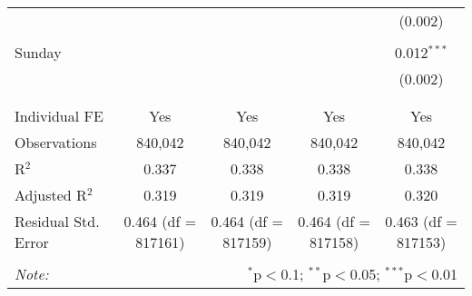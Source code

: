 \documentclass[
]{article}
\begin{document}
\begin{table}[!htbp]
{\begin{tabular}{@{\extracolsep{5pt}}lcccc}
  &  &  &  & (0.002) \\ 
  & & & & \\ 
 Sunday &  &  &  & 0.012$^{***}$ \\ 
  &  &  &  & (0.002) \\ 
  & & & & \\ 
\hline \\[-1.8ex] 
Individual FE & Yes & Yes & Yes & Yes \\ 
Observations & 840,042 & 840,042 & 840,042 & 840,042 \\ 
R$^{2}$ & 0.337 & 0.338 & 0.338 & 0.338 \\ 
Adjusted R$^{2}$ & 0.319 & 0.319 & 0.319 & 0.320 \\ 
Residual Std. Error & 0.464 (df = 817161) & 0.464 (df = 817159) & 0.464 (df = 817158) & 0.463 (df = 817153) \\ 
\hline 
\hline \\[-1.8ex] 
\textit{Note:}  & \multicolumn{4}{r}{$^{*}$p$<$0.1; $^{**}$p$<$0.05; $^{***}$p$<$0.01} \\ 
\end{tabular}
} 
\end{table} 
\newpage
\end{document}
